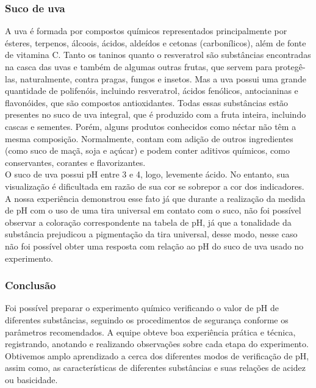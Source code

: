         \subsubsection{Suco de uva}\label{exp2:sucodeuva}
            \indent A uva é formada por compostos químicos representados principalmente por ésteres, terpenos, álcoois, ácidos, aldeídos e cetonas (carbonílicos), além de fonte de vitamina C. Tanto os taninos quanto o resveratrol são substâncias encontradas na casca das uvas e também de algumas outras frutas, que servem para protegê-las, naturalmente, contra pragas, fungos e insetos. Mas a uva possui uma grande quantidade de polifenóis, incluindo resveratrol, ácidos fenólicos, antocianinas e flavonóides, que são compostos antioxidantes. Todas essas substâncias estão presentes no suco de uva integral, que é produzido com a fruta inteira, incluindo cascas e sementes. Porém, alguns produtos conhecidos como néctar não têm a mesma composição. Normalmente, contam com adição de outros ingredientes (como suco de maçã, soja e açúcar) e podem conter aditivos químicos, como conservantes, corantes e flavorizantes.\\

            \indent O suco de uva possui pH entre 3 e 4, logo, levemente ácido. No entanto, sua visualização é dificultada em razão de sua cor se sobrepor a cor dos indicadores. A nossa experiência demonstrou esse fato já que durante a realização  da medida de pH com o uso de uma tira universal em contato com o suco, não foi possível observar a coloração correspondente na tabela de pH, já que a tonalidade da substância prejudicou a pigmentação da tira universal, desse modo, nesse caso não foi possível obter uma resposta com relação ao pH do suco de uva usado no experimento.\\

        \subsubsection{Conclusão}\label{exp2:conclusão}
            \indent Foi possível preparar o experimento químico verificando o valor de pH de diferentes substâncias, seguindo os procedimentos de segurança conforme os parâmetros recomendados. A equipe obteve boa experiência prática e técnica, registrando, anotando e realizando observações sobre cada etapa do experimento. Obtivemos amplo aprendizado a cerca dos diferentes modos de verificação de pH, assim como, as características de diferentes substâncias e suas relações de acidez ou basicidade.\\
    	
        
        
        \newpage

